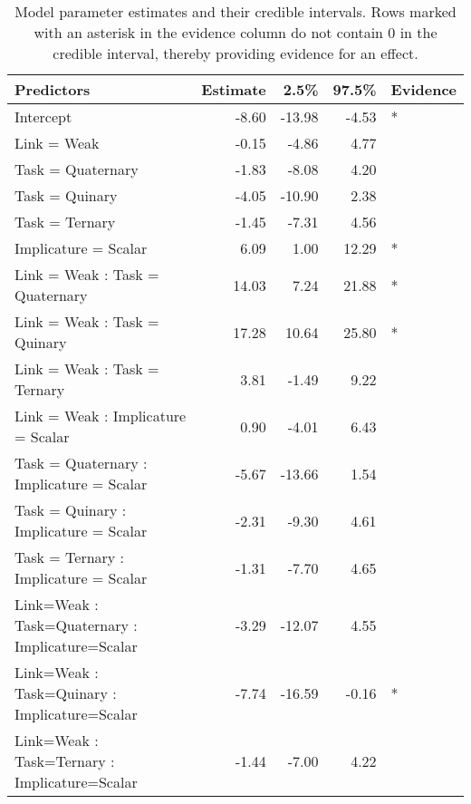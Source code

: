 \documentclass[man]{apa6}
\theoremstyle{definition}
\theoremstyle{definition}
\theoremstyle{definition}
\theoremstyle{remark}
\begin{document}
\begin{table}

\caption{\label{tab:implicatureRate}\label{tab:modeltable}Model parameter estimates and their credible intervals. Rows marked with an asterisk in the evidence column do not contain 0 in the credible interval, thereby providing evidence for an effect.}
\centering
\begin{tabular}[t]{lrrrl}
\toprule
Predictors & Estimate & 2.5\% & 97.5\% & Evidence\\
\midrule
Intercept & -8.60 & -13.98 & -4.53 & *\\
Link = Weak & -0.15 & -4.86 & 4.77 & \\
Task = Quaternary & -1.83 & -8.08 & 4.20 & \\
Task = Quinary & -4.05 & -10.90 & 2.38 & \\
Task = Ternary & -1.45 & -7.31 & 4.56 & \\
\addlinespace
Implicature = Scalar & 6.09 & 1.00 & 12.29 & *\\
Link = Weak : Task = Quaternary & 14.03 & 7.24 & 21.88 & *\\
Link = Weak : Task = Quinary & 17.28 & 10.64 & 25.80 & *\\
Link = Weak : Task = Ternary & 3.81 & -1.49 & 9.22 & \\
Link = Weak : Implicature = Scalar & 0.90 & -4.01 & 6.43 & \\
\addlinespace
Task = Quaternary : Implicature = Scalar & -5.67 & -13.66 & 1.54 & \\
Task = Quinary : Implicature = Scalar & -2.31 & -9.30 & 4.61 & \\
Task = Ternary : Implicature = Scalar & -1.31 & -7.70 & 4.65 & \\
Link=Weak : Task=Quaternary : Implicature=Scalar & -3.29 & -12.07 & 4.55 & \\
Link=Weak : Task=Quinary : Implicature=Scalar & -7.74 & -16.59 & -0.16 & *\\
Link=Weak : Task=Ternary : Implicature=Scalar & -1.44 & -7.00 & 4.22 & \\
\bottomrule
\end{tabular}
\end{table}
\end{document}
